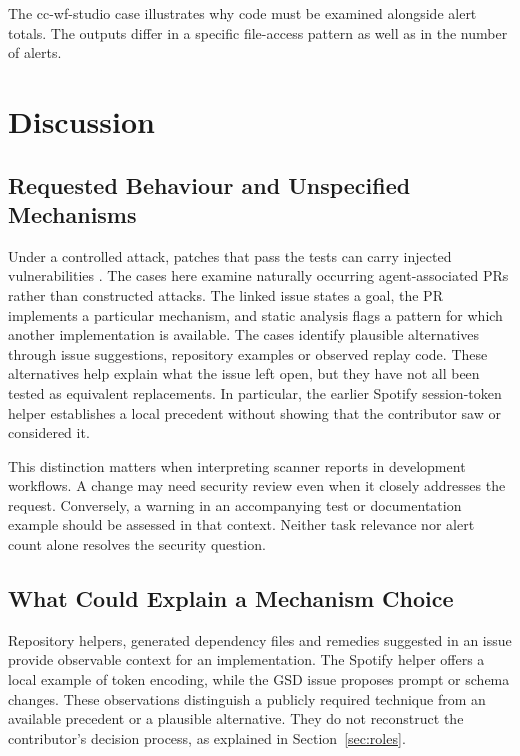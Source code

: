 \documentclass[acmsmall,screen,nonacm]{acmart}
\begin{document}
The cc-wf-studio case illustrates why code must be examined alongside alert totals. The outputs differ in a specific file-access pattern as well as in the number of alerts.

\section{Discussion}

\subsection{Requested Behaviour and Unspecified Mechanisms}

Under a controlled attack, patches that pass the tests can carry injected vulnerabilities \cite{b3}. The cases here examine naturally occurring agent-associated PRs rather than constructed attacks. The linked issue states a goal, the PR implements a particular mechanism, and static analysis flags a pattern for which another implementation is available. The cases identify plausible alternatives through issue suggestions, repository examples or observed replay code. These alternatives help explain what the issue left open, but they have not all been tested as equivalent replacements. In particular, the earlier Spotify session-token helper establishes a local precedent without showing that the contributor saw or considered it.

This distinction matters when interpreting scanner reports in development workflows. A change may need security review even when it closely addresses the request. Conversely, a warning in an accompanying test or documentation example should be assessed in that context. Neither task relevance nor alert count alone resolves the security question.

\subsection{What Could Explain a Mechanism Choice}\label{sec:explain}

Repository helpers, generated dependency files and remedies suggested in an issue provide observable context for an implementation. The Spotify helper offers a local example of token encoding, while the GSD issue proposes prompt or schema changes. These observations distinguish a publicly required technique from an available precedent or a plausible alternative. They do not reconstruct the contributor's decision process, as explained in Section~\ref{sec:roles}.
\end{document}
